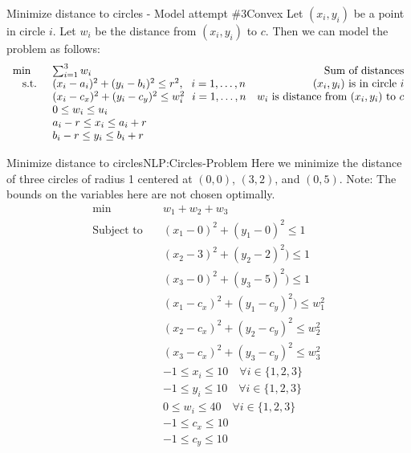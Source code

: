 \documentclass[../open-optimization/open-optimization.tex]{subfiles}
\begin{document}
\begin{general}{Minimize distance to circles - Model attempt $\#3$}{Convex}
Let $(x_i,y_i)$ be a point in circle $i$.  Let $w_i$ be the distance from $(x_i, y_i)$ to $c$.  Then we can  model the problem as follows:
\begin{equation}
\begin{array}{rlr}
\min \quad & \sum_{i=1}^3 w_i \hfill & \text{ Sum of distances}\\
\text{ s.t. } & (x_i - a_i)^2  + (y_i - b_i)^2  \leq r^2 , \ \ i=1,\dots, n& \text{ $(x_i, y_i)$ is in circle $i$}\\
& (x_i - c_x)^2 + (y_i - c_y)^2\leq w_i^2 \ \ i=1, \dots, n & \text{$w_i$ is distance from $(x_i, y_i)$ to $c$}\\
& 0 \leq w_i \leq u_i\\
& a_i - r \leq x_i \leq a_i + r\\
& b_i -r \leq y_i \leq b_i + r\\
\end{array}
\end{equation}
\end{general}

\begin{examplewithcode}{Minimize distance to circles}{NLP:Circles-Problem}
Here we minimize the distance of three circles of radius 1 centered at $(0,0)$, $(3,2)$, and $(0,5)$.  
Note: The bounds on the variables here are not chosen optimally. 
\begin{align*}\min\quad & w_{1} + w_{2} + w_{3}\\
\text{Subject to} \quad & (x_{1} - 0) ^ 2 + (y_{1} - 0)^ 2  \leq 1\\
 & (x_{2} - 3) ^ 2 + (y_{2} - 2) ^ 2)  \leq 1\\
 & (x_{3} - 0) ^ 2 + (y_{3} - 5) ^ 2)  \leq 1\\
 & (x_{1} - c_x) ^ 2 + (y_{1} - c_y) ^ 2) \leq w_{1}^ 2\\
 & (x_{2} - c_x) ^ 2 + (y_{2} - c_y) ^ 2\leq w_{2}^ 2\\
 & (x_{3} - c_x) ^ 2 + (y_{3} - c_y) ^ 2\leq w_{3}^ 2\\
 & -1 \leq x_{i} \leq 10 \quad\forall i \in \{1,2,3\}\\
 & -1 \leq y_{i} \leq 10 \quad\forall i \in \{1,2,3\}\\
 & 0 \leq w_{i} \leq 40 \quad\forall i \in \{1,2,3\}\\
 & -1 \leq c_x \leq 10\\
 & -1 \leq c_y \leq 10\\
\end{align*}
\end{examplewithcode}
\end{document}
